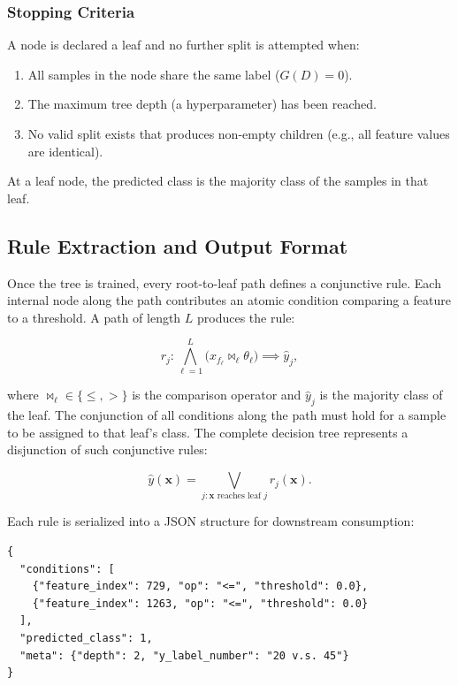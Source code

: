 \subsubsection{Stopping Criteria}

A node is declared a leaf and no further split is attempted when:

\begin{enumerate}
  \item All samples in the node share the same label ($G(D) = 0$).
  \item The maximum tree depth (a hyperparameter) has been reached.
  \item No valid split exists that produces non-empty children (e.g., all feature values are identical).
\end{enumerate}

At a leaf node, the predicted class is the majority class of the samples in that leaf.

\subsection{Rule Extraction and Output Format}
\label{sec:rule_extraction}

Once the tree is trained, every root-to-leaf path defines a conjunctive rule. Each internal node along the path contributes an atomic condition comparing a feature to a threshold. A path of length $L$ produces the rule:

\begin{equation}
r_j: \bigwedge_{\ell = 1}^{L} \bigl( x_{f_\ell} \bowtie_\ell \theta_\ell \bigr) \implies \hat{y}_j,
\label{eq:rule_form}
\end{equation}

where $\bowtie_\ell \in \{\leq, >\}$ is the comparison operator and $\hat{y}_j$ is the majority class of the leaf. The conjunction of all conditions along the path must hold for a sample to be assigned to that leaf's class. The complete decision tree represents a disjunction of such conjunctive rules:

\begin{equation}
\hat{y}(\mathbf{x}) = \bigvee_{j: \mathbf{x} \text{ reaches leaf } j} r_j(\mathbf{x}).
\label{eq:dnf}
\end{equation}

Each rule is serialized into a JSON structure for downstream consumption:

\begin{verbatim}
{
  "conditions": [
    {"feature_index": 729, "op": "<=", "threshold": 0.0},
    {"feature_index": 1263, "op": "<=", "threshold": 0.0}
  ],
  "predicted_class": 1,
  "meta": {"depth": 2, "y_label_number": "20 v.s. 45"}
}
\end{verbatim}

